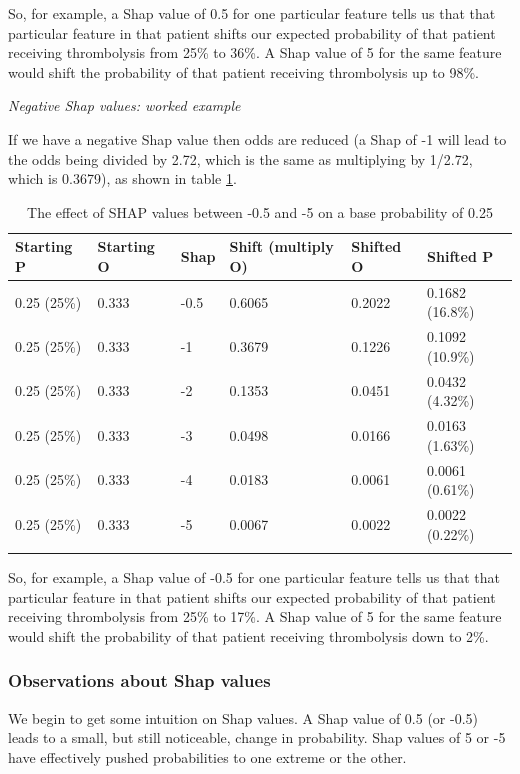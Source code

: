 So, for example, a Shap value of 0.5 for one particular feature tells us
that that particular feature in that patient shifts our expected
probability of that patient receiving thrombolysis from 25\% to 36\%. A
Shap value of 5 for the same feature would shift the probability of that
patient receiving thrombolysis up to 98\%.

\emph{Negative Shap values: worked example}

If we have a negative Shap value then odds are reduced (a Shap of -1
will lead to the odds being divided by 2.72, which is the same as
multiplying by 1/2.72, which is 0.3679), as shown in table \ref{tab:odds_3}.

\begin{minipage}{\textwidth}
\begin{longtable}[]{@{}llllll@{}}
\caption{The effect of SHAP values between -0.5 and -5 on a base probability of 0.25}\\
\toprule
Starting P & Starting O & Shap & Shift (multiply O) & Shifted O &
Shifted P\tabularnewline
\midrule
\endhead
0.25 (25\%) & 0.333 & -0.5 & 0.6065 & 0.2022 & 0.1682
(16.8\%)\tabularnewline
0.25 (25\%) & 0.333 & -1 & 0.3679 & 0.1226 & 0.1092
(10.9\%)\tabularnewline
0.25 (25\%) & 0.333 & -2 & 0.1353 & 0.0451 & 0.0432
(4.32\%)\tabularnewline
0.25 (25\%) & 0.333 & -3 & 0.0498 & 0.0166 & 0.0163
(1.63\%)\tabularnewline
0.25 (25\%) & 0.333 & -4 & 0.0183 & 0.0061 & 0.0061
(0.61\%)\tabularnewline
0.25 (25\%) & 0.333 & -5 & 0.0067 & 0.0022 & 0.0022
(0.22\%)\tabularnewline
\bottomrule
\label{tab:odds_3}
\end{longtable}
\end{minipage}

So, for example, a Shap value of -0.5 for one particular feature tells
us that that particular feature in that patient shifts our expected
probability of that patient receiving thrombolysis from 25\% to 17\%. A
Shap value of 5 for the same feature would shift the probability of that
patient receiving thrombolysis down to 2\%.

\subsubsection{Observations about Shap values}

We begin to get some intuition on Shap values. A Shap value of 0.5 (or
-0.5) leads to a small, but still noticeable, change in probability.
Shap values of 5 or -5 have effectively pushed probabilities to one
extreme or the other.

